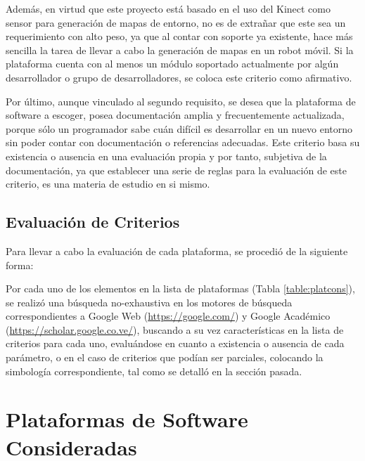 Además, en virtud que este proyecto está basado en el uso del Kinect como sensor para generación de mapas de entorno, no es de extrañar que este sea un requerimiento con alto peso, ya que al contar con soporte ya existente, hace más sencilla la tarea de llevar a cabo la generación de mapas en un robot móvil. Si la plataforma cuenta con al menos un módulo soportado actualmente por algún desarrollador o grupo de desarrolladores, se coloca este criterio como afirmativo.

Por último, aunque vinculado al segundo requisito, se desea que la plataforma de software a escoger, posea documentación amplia y frecuentemente actualizada, porque sólo un programador sabe cuán difícil es desarrollar en un nuevo entorno sin poder contar con documentación o referencias adecuadas. Este criterio basa su existencia o ausencia en una evaluación propia y por tanto, subjetiva de la documentación, ya que establecer una serie de reglas para la evaluación de este criterio, es una materia de estudio en si mismo.

\subsection{Evaluación de Criterios}

Para llevar a cabo la evaluación de cada plataforma, se procedió de la siguiente forma:

Por cada uno de los elementos en la lista de plataformas (Tabla \ref{table:platcons}), se realizó una búsqueda no-exhaustiva en los motores de búsqueda correspondientes a Google Web (\url{https://google.com/}) y Google Académico (\url{https://scholar.google.co.ve/}), buscando a su vez características en la lista de criterios para cada uno, evaluándose en cuanto a existencia o ausencia de cada parámetro, o en el caso de criterios que podían ser parciales, colocando la simbología correspondiente, tal como se detalló en la sección pasada.

\section{Plataformas de Software Consideradas}

